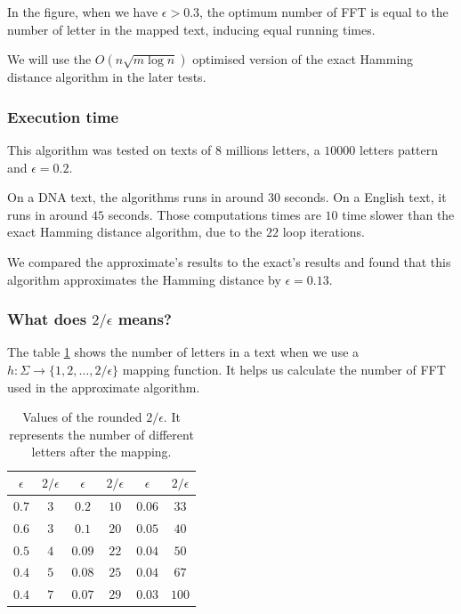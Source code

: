 \documentclass[preprint,12pt]{elsarticle}
\begin{document}
In the figure, when we have $\epsilon > 0.3$,
the optimum number of FFT is equal to the number of letter in the mapped text,
inducing equal running times.

We will use the $O(n \sqrt{m \log n})$ optimised version of the exact Hamming distance
algorithm in the later tests.


\subsubsection*{Execution time}

This algorithm was tested on texts of $8$ millions letters,
a $10 000$ letters pattern and $\epsilon = 0.2$.

On a DNA text, the algorithms runs in around $30$ seconds.
On a English text, it runs in around $45$ seconds.
Those computations times are $10$ time slower than the exact Hamming distance algorithm,
due to the $22$ loop iterations.

We compared the approximate's results to the exact's results
and found that this algorithm approximates the Hamming distance by $\epsilon = 0.13$.


\subsubsection*{What does $2/\epsilon$ means?}

The table \ref{TableEpsilon} shows the number of letters in a text
when we use a $h: \Sigma \rightarrow \{1, 2, \ldots, 2/\epsilon\}$ mapping function.
It helps us calculate the number of FFT used in the approximate algorithm.


\begin{table}[h]
\centering
\begin{tabular}{|c|c||c|c||c|c|}
\hline
$\epsilon$ & $2/ \epsilon$ & $\epsilon$ & $2/ \epsilon$ & $\epsilon$ & $2/ \epsilon$ \\ \hline
$0.7$ & $3$ & $0.2$ & $10$ & $0.06$ & $33$ \\ \hline
$0.6$ & $3$ & $0.1$ & $20$ & $0.05$ & $40$ \\ \hline
$0.5$ & $4$ & $0.09$ & $22$ & $0.04$ & $50$ \\ \hline
$0.4$ & $5$ & $0.08$ & $25$ & $0.04$ & $67$ \\ \hline
$0.4$ & $7$ & $0.07$ & $29$ & $0.03$ & $100$ \\ \hline
\end{tabular}
\caption{Values of the rounded $2 / \epsilon$.
It represents the number of different letters after the mapping.}
\label{TableEpsilon}
\end{table}
\end{document}
